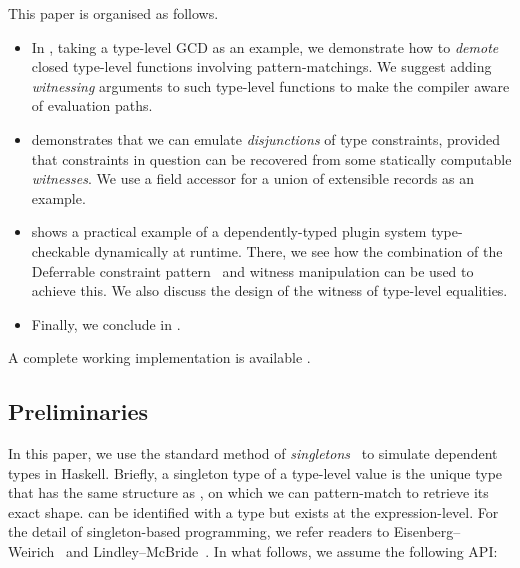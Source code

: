 \documentclass[demotion-paper.tex]{subfiles}
\begin{document}
This paper is organised as follows.
\begin{itemize}
  \item In , taking a type-level GCD as an example, we demonstrate how to \emph{demote} closed type-level functions involving pattern-matchings.
  We suggest adding \emph{witnessing} arguments to such type-level functions to make the compiler aware of evaluation paths.
  \item {} demonstrates that we can emulate \emph{disjunctions} of type constraints, provided that constraints in question can be recovered from some statically computable \emph{witnesses}.
  We use a field accessor for a union of extensible records as an example.
  \item {} shows a practical example of a dependently-typed plugin system type-checkable dynamically at runtime.
  There, we see how the combination of the Deferrable constraint pattern~\cite{Kmett:2020ab} and witness manipulation can be used to achieve this.
  We also discuss the design of the witness of type-level equalities.
  \item Finally, we conclude in .
\end{itemize}

A complete working implementation is available .

\subsection{Preliminaries}
In this paper, we use the standard method of \emph{singletons}~\cite{Eisenberg:2012} to simulate dependent types in Haskell.
Briefly, a singleton type  of a type-level value  is the unique type that has the same structure as , on which we can pattern-match to retrieve its exact shape.
 can be identified with a type  but exists at the expression-level.
For the detail of singleton-based programming, we refer readers to Eisenberg--Weirich~\cite{Eisenberg:2012} and Lindley--McBride~\cite{10.1145/2503778.2503786}.
In what follows, we assume the following API:
\end{document}
